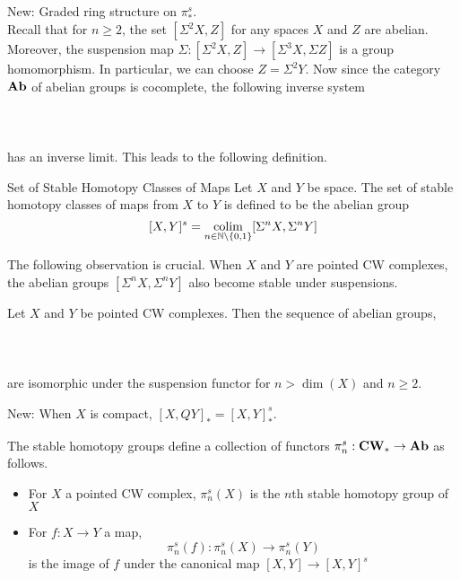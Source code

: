 \documentclass[a4paper]{article}
\begin{document}
New: Graded ring structure on $\pi_\ast^s$. \\

Recall that for $n\geq 2$, the set $[\Sigma^2X,Z]$ for any spaces $X$ and $Z$ are abelian. Moreover, the suspension map $\Sigma:[\Sigma^2X,Z]\to[\Sigma^3X,\Sigma Z]$ is a group homomorphism. In particular, we can choose $Z=\Sigma^2Y$. Now since the category $\bold{Ab}$ of abelian groups is cocomplete, the following inverse system \\~\\
\\~\\
has an inverse limit. This leads to the following definition. 

\begin{defn}{Set of Stable Homotopy Classes of Maps}{} Let $X$ and $Y$ be space. The set of stable homotopy classes of maps from $X$ to $Y$ is defined to be the abelian group $$[X,Y]^s=\operatorname*{colim}_{n\in\mathbb{N}\setminus\{0,1\}}[\Sigma^nX,\Sigma^nY]$$
\end{defn}

The following observation is crucial. When $X$ and $Y$ are pointed CW complexes, the abelian groups $[\Sigma^n X,\Sigma^n Y]$ also become stable under suspensions. 

\begin{thm}{}{} Let $X$ and $Y$ be pointed CW complexes. Then the sequence of abelian groups, \\~\\
\\~\\
are isomorphic under the suspension functor for $n>\dim(X)$ and $n\geq 2$. 
\end{thm}

New: When $X$ is compact, $[X,QY]_\ast=[X,Y]_\ast^s$. 

\begin{thm}{}{} The stable homotopy groups define a collection of functors $\pi_n^s:\bold{CW}_\ast\to\bold{Ab}$ as follows. 
\begin{itemize}
\item For $X$ a pointed CW complex, $\pi_n^s(X)$ is the $n$th stable homotopy group of $X$
\item For $f:X\to Y$ a map, $$\pi_n^s(f):\pi_n^s(X)\to\pi_n^s(Y)$$ is the image of $f$ under the canonical map $[X,Y]\to[X,Y]^s$
\end{itemize}
\end{thm}
\end{document}
